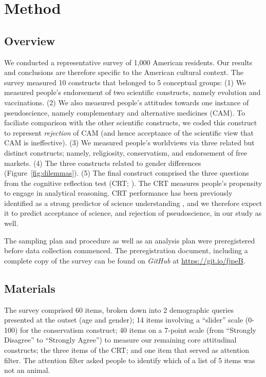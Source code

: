 \documentclass[fignum,man]{apa}\usepackage[]{graphicx}\usepackage[]{color}
\begin{document}
\section{Method}

\subsection{Overview}
We conducted a representative survey of 1,000 American residents.
Our results and conclusions are therefore specific to the American cultural
context.
The survey 
measured 10 constructs that belonged
to 5 conceptual groups:
(1) We measured people's endorsement of
two scientific constructs, namely evolution and vaccinations.
(2) We also measured people's attitudes towards
one instance of pseudoscience, namely
complementary and alternative medicines (CAM). 
To faciliate comparison with the other scientific constructs,
we coded this construct to represent \textit{rejection }of CAM
(and hence acceptance of the scientific view that
CAM is ineffective).
(3) We measured people's worldviews via three
related but distinct constructs; namely,
religiosity, conservatism, and endorsement of free markets.
(4) The three constructs related to gender differences (Figure~\ref{fig:dilemmas}).
(5) The final construct comprised the
three questions from the cognitive reflection test 
(CRT; ).
The CRT measures people's propensity to engage in analytical reasoning.
CRT performance 
has been previously identified as a 
strong predictor of science understanding , and we therefore
expect it to predict acceptance of science, and rejection of pseudoscience, in our
study as well.

The sampling plan and procedure as well as an analysis
plan were preregistered before data collection
commenced. The preregistration document, including a complete
copy of the survey can be found on \textit{GitHub} at 
\url{https://git.io/fjpeB}.


\subsection{Materials}
The survey comprised 60 items, broken
down into 2 demographic queries presented at the outset (age and gender); 
14 items involving a ``slider'' scale (0-100) for the conservatism
construct; 
40 items on a 7-point scale (from ``Strongly Disagree'' to ``Strongly Agree'') 
to measure 
our remaining core attitudinal constructs;
the three items of the CRT;
and one item that served as attention filter. 
The attention filter asked people to identify which of a list of 5 items
was not an animal.
\end{document}
